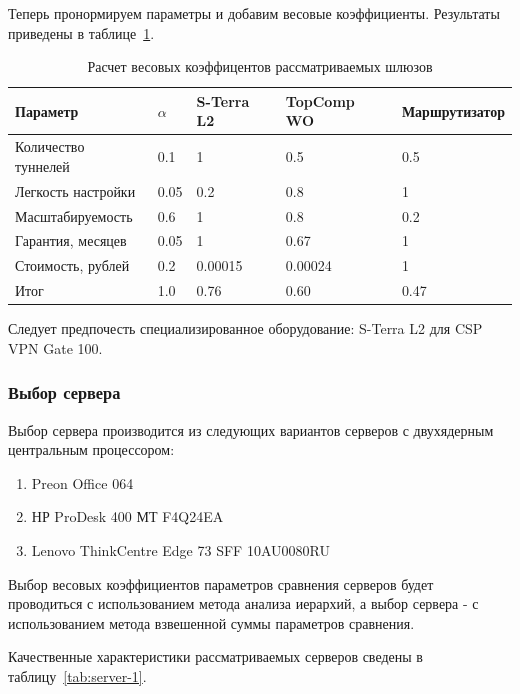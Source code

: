 \documentclass[russian,utf8,emptystyle]{eskdtext}
\begin{document}
Теперь пронормируем параметры и добавим весовые коэффициенты. Результаты приведены в таблице~\ref{tab:vpn-3}.
\begin{longtable}{p{7cm}|p{1cm}|p{2cm}|p{2cm}|p{2cm}}
\caption{Расчет весовых коэффицентов рассматриваемых шлюзов}
\label{tab:vpn-3} \\
Параметр                     & $\alpha$ & S-Terra L2 & TopComp WO & Маршрутизатор \\ 
\hline 
Количество туннелей          & 0.1      & 1          & 0.5        & 0.5        \\ 
Легкость настройки           & 0.05     & 0.2        & 0.8        & 1       \\ 
Масштабируемость             & 0.6      & 1          & 0.8        & 0.2    \\ 
Гарантия, месяцев            & 0.05     & 1          & 0.67       & 1       \\ 
Стоимость, рублей            & 0.2      & 0.00015    & 0.00024    & 1        \\
\hline
Итог                         & 1.0      & 0.76       & 0.60       & 0.47
\end{longtable}

Следует предпочесть специализированное оборудование: S-Terra L2 для CSP VPN Gate 100.

\clearpage
\subsubsection{Выбор сервера}
Выбор сервера производится из следующих вариантов серверов с двухядерным центральным процессором:
\begin{enumerate}[label=\arabic*.]
\item Preon Office 064
\item НР ProDesk 400 МТ F4Q24EA
\item Lenovo ThinkCentre Edge 73 SFF 10AU0080RU
\end{enumerate}

Выбор весовых коэффициентов параметров сравнения серверов будет проводиться с использованием метода анализа иерархий, а выбор сервера - с использованием метода взвешенной суммы параметров сравнения.

Качественные характеристики рассматриваемых серверов сведены в таблицу~\ref{tab:server-1}.
\end{document}
